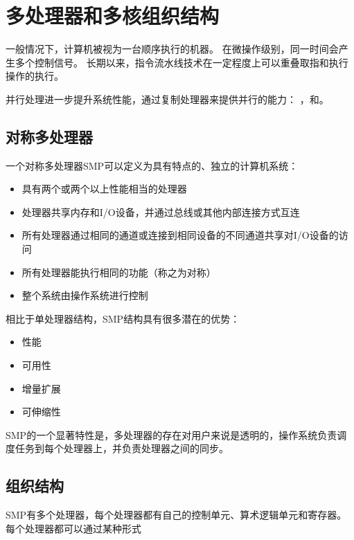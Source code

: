 
\section{多处理器和多核组织结构}
{
    一般情况下，计算机被视为一台顺序执行的机器。
    在微操作级别，同一时间会产生多个控制信号。
    长期以来，指令流水线技术在一定程度上可以重叠取指和执行操作的执行。

    并行处理进一步提升系统性能，通过复制处理器来提供并行的能力：
    ，和。

    \subsection{对称多处理器}
    {
        一个对称多处理器SMP可以定义为具有特点的、独立的计算机系统：

        \begin{itemize}
            \item 具有两个或两个以上性能相当的处理器
            \item 处理器共享内存和I/O设备，并通过总线或其他内部连接方式互连
            \item 所有处理器通过相同的通道或连接到相同设备的不同通道共享对I/O设备的访问
            \item 所有处理器能执行相同的功能（称之为对称）
            \item 整个系统由操作系统进行控制
        \end{itemize}

        相比于单处理器结构，SMP结构具有很多潜在的优势：

    \begin{itemize}
        \item 性能
        \item 可用性
        \item 增量扩展
        \item 可伸缩性
    \end{itemize}

    SMP的一个显著特性是，多处理器的存在对用户来说是透明的，操作系统负责调度任务到每个处理器上，并负责处理器之间的同步。
    }

    \subsection{组织结构}
    {
        SMP有多个处理器，每个处理器都有自己的控制单元、算术逻辑单元和寄存器。
        每个处理器都可以通过某种形式
    }
}

